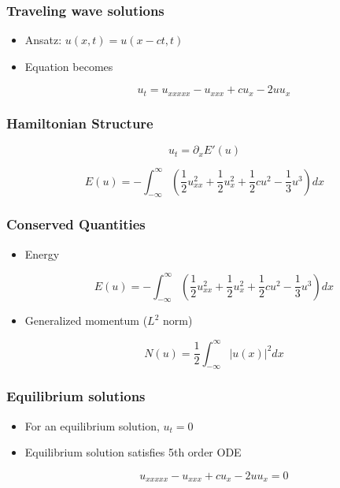 \documentclass[16pt]{beamer}
\begin{document}
\begin{frame}
	\frametitle{Traveling wave solutions}
	\fontsize{18}{7.2}\selectfont
	\begin{itemize}
		\item<1-> Ansatz: $u(x, t) = u(x - ct, t) $

		\vspace{0.5cm}
		\item<2-> Equation becomes
		\begin{center}
		\[ u_t = u_{xxxxx} - u_{xxx} + c u_x - 2 u u_x \]
		\end{center}
	\end{itemize}
\end{frame}

\begin{frame}
	\frametitle{Hamiltonian Structure}
	\fontsize{16}{7.2}\selectfont
		\begin{center}
		\[ u_t = \partial_x E'(u) \]
		\end{center}

		\begin{center}
		\[ E(u) = -\int_{-\infty}^{\infty} \left( \frac{1}{2}u_{xx}^2 + \frac{1}{2}u_x^2 + \frac{1}{2}cu^2 - \frac{1}{3}u^3 \right) dx \]
		\end{center}
\end{frame}

\begin{frame}
	\frametitle{Conserved Quantities}
	\fontsize{16}{7.2}\selectfont
	\begin{itemize}
		\item Energy
		\begin{center}
		\[ E(u) = -\int_{-\infty}^{\infty} \left( \frac{1}{2}u_{xx}^2 + \frac{1}{2}u_x^2 + \frac{1}{2}cu^2 - \frac{1}{3}u^3 \right) dx \]
		\end{center}

		\item Generalized momentum ($L^2$ norm)

		\begin{center}
		\[ N(u) = \frac{1}{2} \int_{-\infty}^\infty |u(x)|^2 dx \]
		\end{center}
	\end{itemize}
\end{frame}

\begin{frame}
	\frametitle{Equilibrium solutions}
	\fontsize{18}{7.2}\selectfont
	\begin{itemize}
		\item<1-> For an equilibrium solution, $u_t = 0$

		\vspace{0.5cm}
		\item<2-> Equilibrium solution satisfies 5th order ODE 
		\begin{center}
		\[ u_{xxxxx} - u_{xxx} + c u_x - 2 u u_x = 0 \]
		\end{center}
	\end{itemize}
\end{frame}
\end{document}
